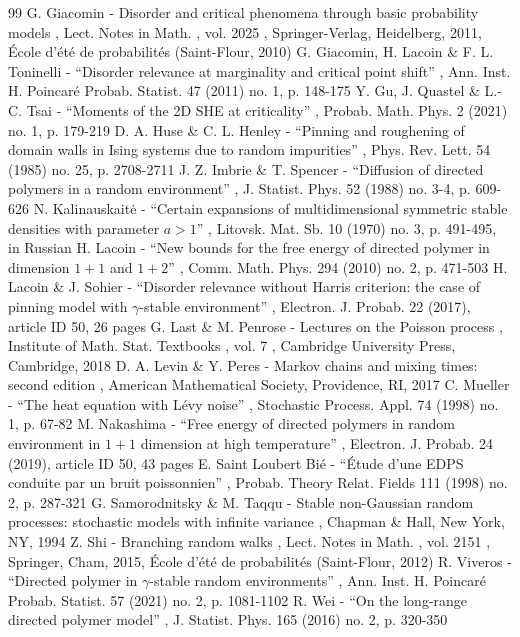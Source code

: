 \documentclass[11pt]{article}
\numberwithin{equation}{section}
\theoremstyle{definition}
\begin{document}
\begin{thebibliography}{99}
 G. Giacomin - Disorder and critical phenomena through basic probability models , Lect. Notes in Math. , vol. 2025 , Springer-Verlag, Heidelberg, 2011, École d’été de probabilités (Saint-Flour, 2010)
 G. Giacomin, H. Lacoin \& F. L. Toninelli - “Disorder relevance at marginality and critical point shift” , Ann. Inst. H. Poincaré Probab. Statist. 47 (2011) no. 1, p. 148-175
 Y. Gu, J. Quastel \& L.-C. Tsai - “Moments of the 2D SHE at criticality” , Probab. Math. Phys. 2 (2021) no. 1, p. 179-219
 D. A. Huse \& C. L. Henley - “Pinning and roughening of domain walls in Ising systems due to random impurities” , Phys. Rev. Lett. 54 (1985) no. 25, p. 2708-2711
 J. Z. Imbrie \& T. Spencer - “Diffusion of directed polymers in a random environment” , J. Statist. Phys. 52 (1988) no. 3-4, p. 609-626
 N. Kalinauskaitė - “Certain expansions of multidimensional symmetric stable densities with parameter $a>1$” , Litovsk. Mat. Sb. 10 (1970) no. 3, p. 491-495, in Russian
 H. Lacoin - “New bounds for the free energy of directed polymer in dimension $1+1$ and $1+2$” , Comm. Math. Phys. 294 (2010) no. 2, p. 471-503
 H. Lacoin \& J. Sohier - “Disorder relevance without Harris criterion: the case of pinning model with $\gamma $-stable environment” , Electron. J. Probab. 22 (2017), article ID 50, 26 pages
 G. Last \& M. Penrose - Lectures on the Poisson process , Institute of Math. Stat. Textbooks , vol. 7 , Cambridge University Press, Cambridge, 2018
 D. A. Levin \& Y. Peres - Markov chains and mixing times: second edition , American Mathematical Society, Providence, RI, 2017
 C. Mueller - “The heat equation with Lévy noise” , Stochastic Process. Appl. 74 (1998) no. 1, p. 67-82
 M. Nakashima - “Free energy of directed polymers in random environment in $1+1$ dimension at high temperature” , Electron. J. Probab. 24 (2019), article ID 50, 43 pages
 E. Saint Loubert Bié - “Étude d’une EDPS conduite par un bruit poissonnien” , Probab. Theory Relat. Fields 111 (1998) no. 2, p. 287-321
 G. Samorodnitsky \& M. Taqqu - Stable non-Gaussian random processes: stochastic models with infinite variance , Chapman \& Hall, New York, NY, 1994
 Z. Shi - Branching random walks , Lect. Notes in Math. , vol. 2151 , Springer, Cham, 2015, École d’été de probabilités (Saint-Flour, 2012)
 R. Viveros - “Directed polymer in $\gamma $-stable random environments” , Ann. Inst. H. Poincaré Probab. Statist. 57 (2021) no. 2, p. 1081-1102
 R. Wei - “On the long-range directed polymer model” , J. Statist. Phys. 165 (2016) no. 2, p. 320-350
\end{thebibliography}
\end{document}
